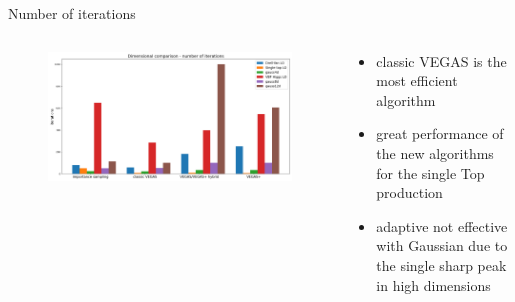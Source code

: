 \documentclass[t,handout,professionalfont,serif]{beamer}
\begin{document}
\begin{frame}{Number of iterations}
	
		\tiny
	\begin{columns}
		\begin{column}{0.7 \textwidth}
			\begin{figure}
				\includegraphics[width= \columnwidth]{iter_final.png}
			\end{figure}
			
		\end{column}
		\hspace{-0.5cm}
		\begin{column}{0.3 \textwidth}
			\vspace{0.6cm}
			
			\begin{itemize}\setlength\itemsep{3em}
				
				\item classic VEGAS is the most efficient algorithm
				\item great performance of the new algorithms for the single Top production
				\item adaptive not effective with Gaussian due to the single sharp peak in high dimensions
			\end{itemize}
		\end{column}
	\end{columns}
	

	
\end{frame}
\end{document}

